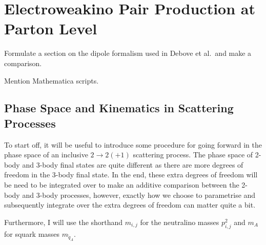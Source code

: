 \documentclass[../main.tex]{subfiles}
\begin{document}
\chapter{Electroweakino Pair Production at Parton Level}
\label{chap:part}

\begin{TODO}
  \item Formulate a section on the dipole formalism used in Debove et al.\ and make a comparison.
  \item Mention Mathematica scripts.
\end{TODO}

\section{Phase Space and Kinematics in Scattering Processes}
To start off, it will be useful to introduce some procedure for going forward
in the phase space of an inclusive \(2\to 2(+1)\) scattering process.
The phase space of 2-body and 3-body final states are quite different as there are
more degrees of freedom in the 3-body final state.
In the end, these extra degrees of freedom will be need to be integrated over to make an additive
comparison between the 2-body and 3-body processes, however, exactly how we
choose to parametrise and subsequently integrate over the extra degrees of
freedom can matter quite a bit.
\medskip

Furthermore, I will use the shorthand \(m_{i,j}\) for the neutralino masses \(p_{i,j}^2\) and \(m_A\) for squark masses \(m_{\tilde{q}_A}\).
\end{document}
